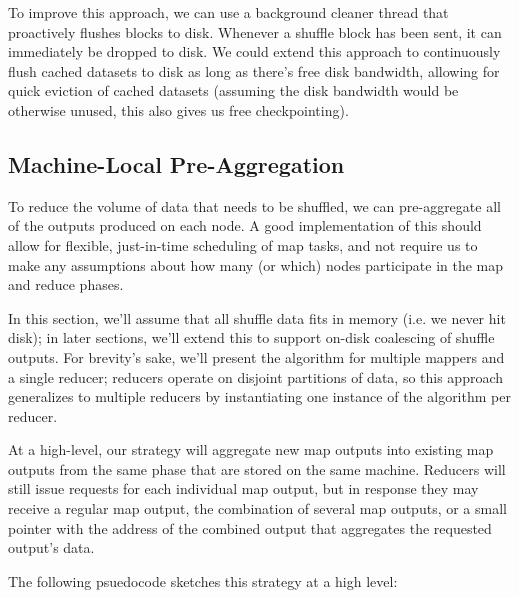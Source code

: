 \documentclass[12pt]{article}
\begin{document}
To improve this approach, we can use a background cleaner thread that
proactively flushes blocks to disk.  Whenever a shuffle block has been sent,
it can immediately be dropped to disk.  We could extend this approach to
continuously flush cached datasets to disk as long as there's free disk
bandwidth, allowing for quick eviction of cached datasets (assuming the disk
bandwidth would be otherwise unused, this also gives us free checkpointing).


\subsection{Machine-Local Pre-Aggregation}

To reduce the volume of data that needs to be shuffled, we can pre-aggregate
all of the outputs produced on each node.  A good implementation of this
should allow for flexible, just-in-time scheduling of map tasks, and not
require us to make any assumptions about how many (or which) nodes participate
in the map and reduce phases.

In this section, we'll assume that all shuffle data fits in memory (i.e. we
never hit disk); in later sections, we'll extend this to support on-disk
coalescing of shuffle outputs.  For brevity's sake, we'll present the
algorithm for multiple mappers and a single reducer; reducers operate on
disjoint partitions of data, so this approach generalizes to multiple reducers
by instantiating one instance of the algorithm per reducer.

At a high-level, our strategy will aggregate new map outputs into existing map
outputs from the same phase that are stored on the same machine.  Reducers will
still issue requests for each individual map output, but in response they may
receive a regular map output, the combination of several map outputs, or a
small pointer with the address of the combined output that aggregates the
requested output's data.

The following psuedocode sketches this strategy at a high level:
\end{document}
